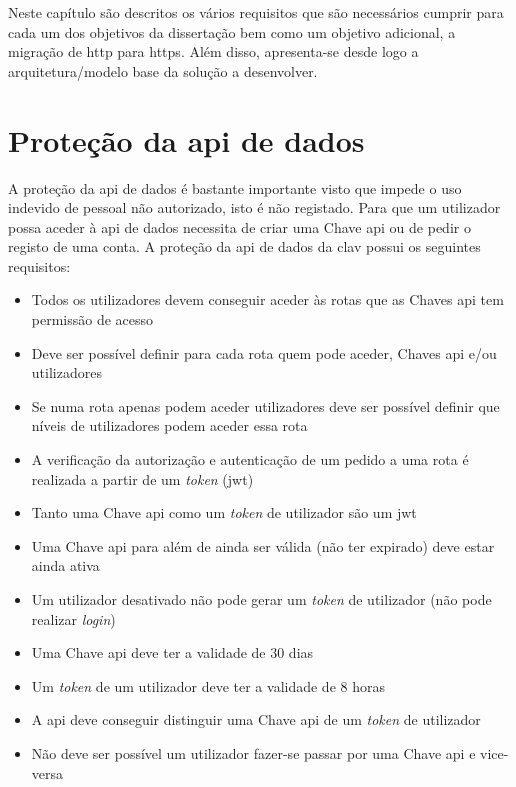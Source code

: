 Neste capítulo são descritos os vários requisitos que são necessários cumprir para cada um dos objetivos da dissertação bem como um objetivo adicional, a migração de \acrshort{http} para \acrshort{https}. Além disso, apresenta-se desde logo a arquitetura/modelo base da solução a desenvolver.

\section{Proteção da \acrshort{api} de dados}

A proteção da \acrshort{api} de dados é bastante importante visto que impede o uso indevido de pessoal não autorizado, isto é não registado. Para que um utilizador possa aceder à \acrshort{api} de dados necessita de criar uma Chave \acrshort{api} ou de pedir o registo de uma conta. A proteção da \acrshort{api} de dados da \acrshort{clav} possui os seguintes requisitos:
\begin{itemize}
    \item Todos os utilizadores devem conseguir aceder às rotas que as Chaves \acrshort{api} tem permissão de acesso
    \item Deve ser possível definir para cada rota quem pode aceder, Chaves \acrshort{api} e/ou utilizadores
    \item Se numa rota apenas podem aceder utilizadores deve ser possível definir que níveis de utilizadores podem aceder essa rota
    \item A verificação da autorização e autenticação de um pedido a uma rota é realizada a partir de um \textit{token} (\acrshort{jwt})
    \item Tanto uma Chave \acrshort{api} como um \textit{token} de utilizador são um \acrshort{jwt}
    \item Uma Chave \acrshort{api} para além de ainda ser válida (não ter expirado) deve estar ainda ativa
    \item Um utilizador desativado não pode gerar um \textit{token} de utilizador (não pode realizar \textit{login})
    \item Uma Chave \acrshort{api} deve ter a validade de 30 dias
    \item Um \textit{token} de um utilizador deve ter a validade de 8 horas
    \item A \acrshort{api} deve conseguir distinguir uma Chave \acrshort{api} de um \textit{token} de utilizador
    \item Não deve ser possível um utilizador fazer-se passar por uma Chave \acrshort{api} e vice-versa
\end{itemize}

